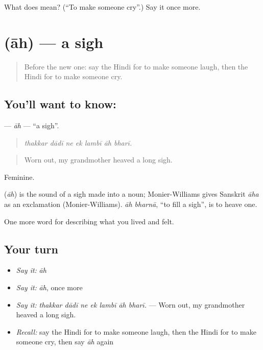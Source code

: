 \begin{tcolorbox}[breakable,colback=teal!4,colframe=teal!35!black,title={Before you move on}]
What does  mean? (\textquotedblleft{}To make someone cry\textquotedblright{}.) Say it once more.
\end{tcolorbox}
\section[\texorpdfstring{\hi{आह} (āh)}{आह (āh)}]{ (āh) — a sigh}

\label{lesson:HI-C465-ah}



\begin{quote}
Before the new one: say the Hindi for to make someone laugh, then the Hindi for to make someone cry.
\end{quote}

\subsection*{You'll want to know: }
\textbf{} — \emph{āh} — \textquotedblleft{}a sigh\textquotedblright{}.

\begin{quote}
      
\end{quote}

\begin{quote}
\emph{thakkar dādī ne ek lambī āh bharī.}
\end{quote}

\begin{quote}
Worn out, my grandmother heaved a long sigh.
\end{quote}

Feminine.

\begin{cousinweb}
\textbf{} (\emph{āh}) is the sound of a sigh made into a noun; Monier-Williams gives Sanskrit \emph{āha} as an exclamation (Monier-Williams). \emph{āh bharnā}, \textquotedblleft{}to fill a sigh\textquotedblright{}, is to heave one.
\end{cousinweb}

\begin{grammarlens}[title={What you've built}]
One more word for describing what you lived and felt.
\end{grammarlens}

\subsection*{Your turn}
\begin{itemize}
\raggedright
  \item \emph{Say it:} \emph{āh}
  \item \emph{Say it:} \emph{āh}, once more
  \item \emph{Say it:} \emph{thakkar dādī ne ek lambī āh bharī.} — Worn out, my grandmother heaved a long sigh.
  \item \emph{Recall:} say the Hindi for to make someone laugh, then the Hindi for to make someone cry, then say \emph{āh} again
\end{itemize}

